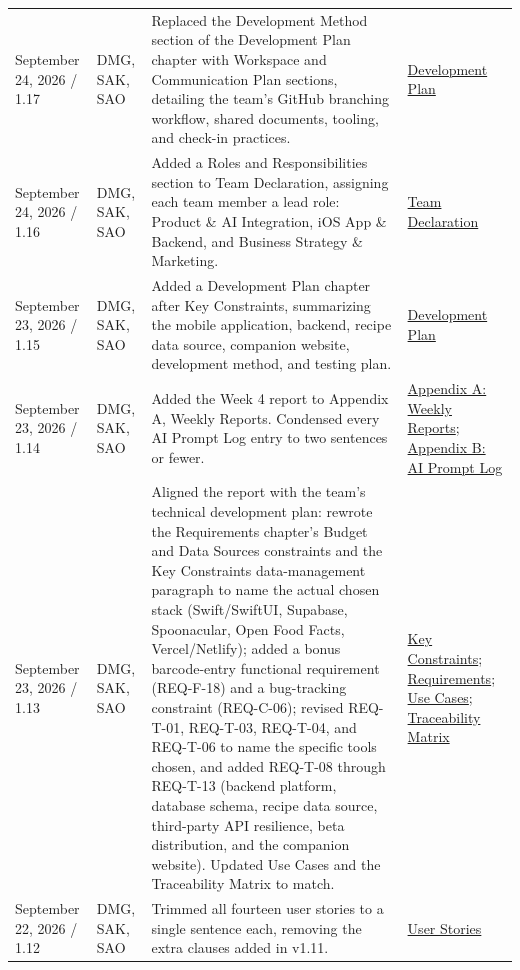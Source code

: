 \begin{tabularx}{\linewidth}{L{2.7cm}L{2.0cm}YL{2.4cm}}
September 24, 2026 / 1.17 & DMG, SAK, SAO & Replaced the Development Method section of the Development Plan chapter with Workspace and Communication Plan sections, detailing the team's GitHub branching workflow, shared documents, tooling, and check-in practices. & \hyperref[Chapter:DevelopmentPlan]{Development Plan}\\
September 24, 2026 / 1.16 & DMG, SAK, SAO & Added a Roles and Responsibilities section to Team Declaration, assigning each team member a lead role: Product \& AI Integration, iOS App \& Backend, and Business Strategy \& Marketing. & \hyperref[Chapter:TeamDeclaration]{Team Declaration}\\
September 23, 2026 / 1.15 & DMG, SAK, SAO & Added a Development Plan chapter after Key Constraints, summarizing the mobile application, backend, recipe data source, companion website, development method, and testing plan. & \hyperref[Chapter:DevelopmentPlan]{Development Plan}\\
September 23, 2026 / 1.14 & DMG, SAK, SAO & Added the Week 4 report to Appendix A, Weekly Reports. Condensed every AI Prompt Log entry to two sentences or fewer. & \hyperref[Chapter:WeeklyReports]{Appendix A: Weekly Reports}; \hyperref[Chapter:AIPromptLog]{Appendix B: AI Prompt Log}\\
September 23, 2026 / 1.13 & DMG, SAK, SAO & Aligned the report with the team's technical development plan: rewrote the Requirements chapter's Budget and Data Sources constraints and the Key Constraints data-management paragraph to name the actual chosen stack (Swift/SwiftUI, Supabase, Spoonacular, Open Food Facts, Vercel/Netlify); added a bonus barcode-entry functional requirement (REQ-F-18) and a bug-tracking constraint (REQ-C-06); revised REQ-T-01, REQ-T-03, REQ-T-04, and REQ-T-06 to name the specific tools chosen, and added REQ-T-08 through REQ-T-13 (backend platform, database schema, recipe data source, third-party API resilience, beta distribution, and the companion website). Updated Use Cases and the Traceability Matrix to match. & \hyperref[Chapter:KeyConstraints]{Key Constraints}; \hyperref[Chapter:Requirements]{Requirements}; \hyperref[Chapter:UseCases]{Use Cases}; \hyperref[Chapter:Traceability]{Traceability Matrix}\\
September 22, 2026 / 1.12 & DMG, SAK, SAO & Trimmed all fourteen user stories to a single sentence each, removing the extra clauses added in v1.11. & \hyperref[Chapter:UserStories]{User Stories}\\

\end{tabularx}
